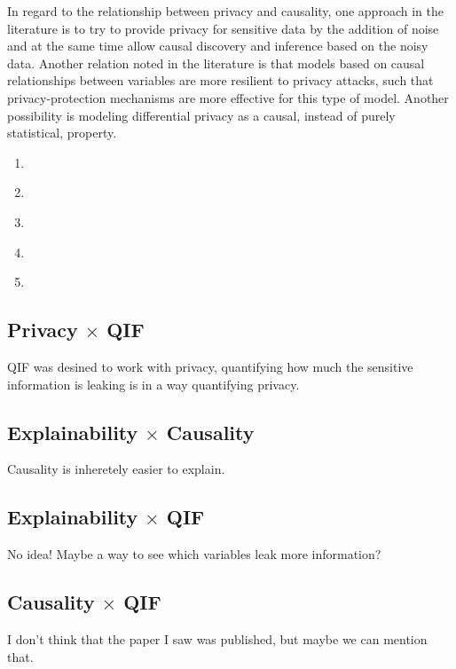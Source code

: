 In regard to the relationship between privacy and causality, one approach in the literature is to try to provide privacy for sensitive data by the addition of noise and at the same time allow causal discovery and inference based on the noisy data. Another relation noted in the literature is that models based on causal relationships between variables are more resilient to privacy attacks, such that privacy-protection mechanisms are more effective for this type of model. Another possibility is modeling differential privacy as a causal, instead of purely statistical, property. 

\begin{enumerate}
\item \cite{Causal Discovery Under Local Privacy} 
\item \cite{Alleviating Privacy Attacks via Causal Learning} 
\item \cite{SoK: Differential Privacy as a Causal Property} 
\item \cite{Differential Privacy Preserving Causal Graph Discovery} 
\item \cite{Private Causal Inference} 
\end{enumerate}

\subsection{Privacy $\times$ QIF}

{\color{red} QIF was desined to work with privacy, quantifying how much the sensitive information is leaking is in a way quantifying privacy.}

\subsection{Explainability $\times$ Causality}

{\color{red} Causality is inheretely easier to explain.}

\subsection{Explainability $\times$ QIF}

{\color{red} No idea! Maybe a way to see which variables leak more information?}

\subsection{Causality $\times$ QIF}

{\color{red} I don't think that the paper I saw was published, but maybe we can mention that.}

